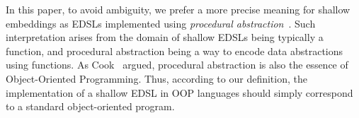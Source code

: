 \begin{comment}
For example, in their work
on EDSLs~\cite{}, Gibbons and Wu claim that deep embeddings (which
encode ASTs using algebraic datatypes in Haskell) allow adding new DSL
interpretations easily, but they make adding new language constructs
difficult. In contrast Gibbons and Wu claim that shallow embeddings
have dual modularity properties: new cases are easy to add, but new
interpretations are hard.  However what if, instead of using Haskell
and algebraic datatypes, one uses an OO language to encode an AST, for
example with the {\sc Composite} pattern.  Would this OO approach be
classified as a shallow or deep embedding? We believe arguments can be
made both ways. Since the {\sc Composite}
pattern is normally accepted to be a way to encode ASTs, it would be
reasonable to say that \emph{according to definition of deep embedding
  above, the OO approach classifies as a deep
  embedding}. Unfortunatelly this interpretation could be problematic.
As the Expression Problem~\cite{} tell us,
in the OO approach adding new language constructs is easy, but adding
interpretations is hard. Thus this would contradict Gibbons and Wu's
claims, since we have an AST representation (i.e. a deep embedding)
with the modularity properties of shallow embeddings.

We believe that the core of problem is that ASTs can be represented in
multiple ways. In particular, it is well know that functions alone are
enough to encode datastructures such as ASTs (via Church
encodings~\cite{}).  Distinguishing deep and shallow embeddings based
solely on whether a ``real'' datastructure is being used or not is
misleading.  Moreover, it gives the impression that shallow embeddings
are significantly less expressive than deep embeddings, because they
do not have access to the datastructure.
Gibbons and Wu themselves feel uneasy with the definition of shallow 
embeddings when they say:
``\emph{So it turns out that the syntax of the DSL is not really as ephemeral
in a shallow embedding as Boulton's choice of terms suggests.}''
\end{comment}

In this paper, to avoid ambiguity, we prefer a more precise meaning
for shallow embeddings as EDSLs implemented using \emph{procedural abstraction}~\cite{reynolds94proceduralabstraction}. Such
interpretation arises from the domain of shallow EDSLs being
typically a function, and procedural abstraction being a way to encode
data abstractions using functions. As Cook~\cite{cook09abstraction} argued,
procedural abstraction is also the essence of Object-Oriented
Programming. Thus, according to our definition, the implementation of a shallow
EDSL in OOP languages should simply correspond to a standard
object-oriented program.


